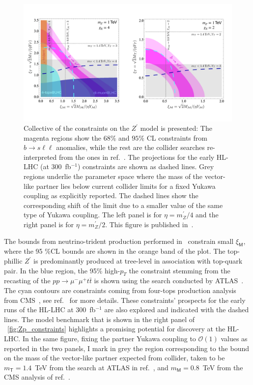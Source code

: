 \begin{figure}[htpb!]
	\includegraphics[scale=0.235]{figures/Zprime_constraint_CLu.pdf}
	\caption{ Collective of the constraints on the $Z^\prime$ model is presented: The magenta regions show the  $68\%$ and $ 95\%$ CL  constraints from $ b \to s \ell \ell$ anomalies, while the rest are the collider searches re-interpreted from the ones in ref.~\cite{Camargo-Molina:2018cwu}. The projections for the early HL-LHC  (at 300~fb$^{-1}$) constraints are shown as dashed lines. Grey regions underlie the parameter space where the mass of the vector-like partner lies below current collider limits for a fixed Yukawa coupling as explicitly reported. The dashed lines show the corresponding shift of the limit due to a smaller value of the same type of Yukawa coupling. The left panel is for $\eta = m_Z^\prime /4$
		and the right panel is for $\eta = m_Z^\prime /2$. This figure is published in~\cite{Alasfar:2020mne}.}
	\label{fig:Zp_constraints}
\end{figure}
The bounds from neutrino-trident production performed in~\cite{Mishra:1991bv} constrain small $\xi_{\mathsf{M}}$, where the 95 \%CL bounds are shown in the orange band of the plot.  The top-phillic $Z^{\prime}$  is predominantly produced at tree-level in association with top-quark pair. In the blue region, the 95\% high-$p_{T}$  the constraint stemming from the recasting of the $p p \to \mu^{-} \mu^{+} t \bar{t} $ is shown using the search conducted by ATLAS~\cite{Aaboud:2017buh,ATLAS-CONF-2019-001}. The cyan contours are constraints coming from four-tops production analysis from CMS~\cite{Sirunyan:2017roi}, see ref.~\cite{Camargo-Molina:2018cwu} for more details.  These constraints' prospects for the early runs of the HL-LHC at 300~fb$^{-1}$ are also explored and indicated with the dashed lines. The model benchmark that is shown in the right panel of ~\autoref{fig:Zp_constraints} highlights a promising potential for discovery at the HL-LHC. 
In the same figure, fixing the partner Yukawa coupling to  $\mathcal{O}(1)$ values as reported in the two panels, I mark in grey the region corresponding to the bound on the mass of the vector-like partner expected from collider, taken to be $m_{\mathsf{T}} = 1.4$~TeV from the search at ATLAS in ref.~\cite{Aaboud:2018uek}, and $m_{\mathsf{M}} = 0.8$~TeV from the CMS analysis of ref.~\cite{Sirunyan:2019ofn}.\\
